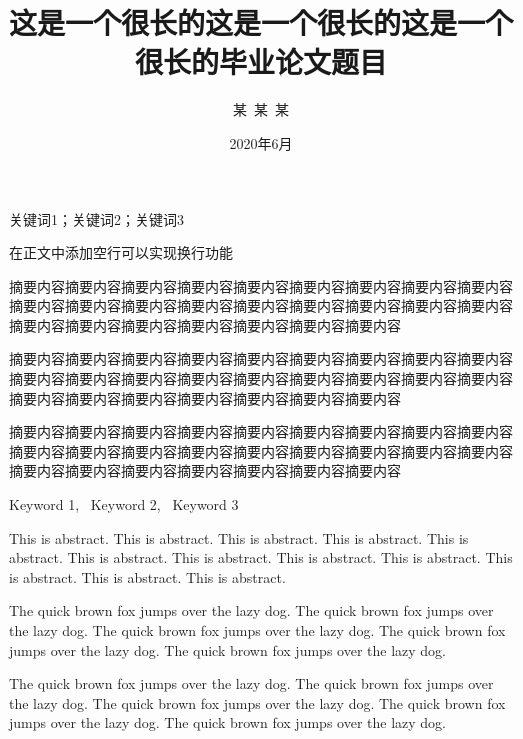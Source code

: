\documentclass{shnuthesis}
\title{这是一个很长的这是一个很长的这是一个很长的毕业论文题目}
\author{某~某~某} %
\date{2020年6月}  %
\begin{document}
\maketitle


\clearpage   %

\begin{cnabstract}{关键词1；关键词2；关键词3}

在正文中添加空行可以实现换行功能
		
摘要内容摘要内容摘要内容摘要内容摘要内容摘要内容摘要内容摘要内容摘要内容摘要内容摘要内容摘要内容摘要内容摘要内容摘要内容摘要内容摘要内容摘要内容摘要内容摘要内容摘要内容摘要内容摘要内容摘要内容摘要内容
		
摘要内容摘要内容摘要内容摘要内容摘要内容摘要内容摘要内容摘要内容摘要内容摘要内容摘要内容摘要内容摘要内容摘要内容摘要内容摘要内容摘要内容摘要内容摘要内容摘要内容摘要内容摘要内容摘要内容摘要内容摘要内容

摘要内容摘要内容摘要内容摘要内容摘要内容摘要内容摘要内容摘要内容摘要内容摘要内容摘要内容摘要内容摘要内容摘要内容摘要内容摘要内容摘要内容摘要内容摘要内容摘要内容摘要内容摘要内容摘要内容摘要内容摘要内容

\end{cnabstract}



\begin{enabstract}{Keyword 1,~ Keyword 2,~ Keyword 3}


This is abstract. This is abstract. This is abstract. This is abstract. This is abstract. This is abstract. This is abstract. This is abstract. This is abstract. This is abstract. This is abstract. This is abstract.
		
The quick brown fox jumps over the lazy dog. The quick brown fox jumps over the lazy dog. The quick brown fox jumps over the lazy dog. The quick brown fox jumps over the lazy dog. The quick brown fox jumps over the lazy dog.

The quick brown fox jumps over the lazy dog. The quick brown fox jumps over the lazy dog. The quick brown fox jumps over the lazy dog. The quick brown fox jumps over the lazy dog. The quick brown fox jumps over the lazy dog.

\end{enabstract}
	
\end{document}
